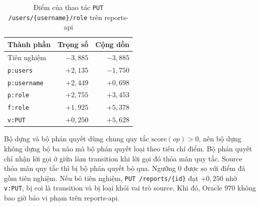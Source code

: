 \begin{table}[htbp]
  \centering
  \caption{Điểm của thao tác \texttt{PUT /users/\{username\}/role} trên reports-api}
  \label{tab:nb_example}
  \begin{tabular}{@{}l r r@{}}
    \toprule
    Thành phần & Trọng số & Cộng dồn \\
    \midrule
    Tiên nghiệm & $-3{,}885$ & $-3{,}885$ \\
    \texttt{p:users} & $+2{,}135$ & $-1{,}750$ \\
    \texttt{p:username} & $+2{,}449$ & $+0{,}698$ \\
    \texttt{p:role} & $+2{,}755$ & $+3{,}453$ \\
    \texttt{f:role} & $+1{,}925$ & $+5{,}378$ \\
    \texttt{v:PUT} & $+0{,}250$ & $+5{,}628$ \\
    \bottomrule
  \end{tabular}
\end{table}

Bộ dựng và bộ phán quyết dùng chung quy tắc $\mathrm{score}(op) > 0$, nên bộ dựng không dựng bộ ba nào mà bộ phán quyết loại theo tiêu chí điểm. Bộ phán quyết chỉ nhận lời gọi ở giữa làm transition khi lời gọi đó thỏa mãn quy tắc. Source thỏa mãn quy tắc thì bị bộ phán quyết bỏ qua. Ngưỡng 0 được so với điểm đã gồm tiên nghiệm. Nếu bỏ tiên nghiệm, \texttt{PUT /reports/\{id\}} đạt $+0{,}250$ nhờ \texttt{v:PUT}, bị coi là transition và bị loại khỏi vai trò source. Khi đó, Oracle 970 không bao giờ báo vi phạm trên reports-api.

\endgroup

